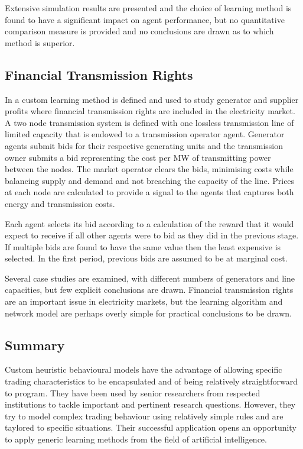 Extensive simulation results are presented and the choice of learning method is
found to have a significant impact on agent performance, but no quantitative
comparison measure is provided and no conclusions are drawn as to which method
is superior.

\subsection{Financial Transmission Rights}
In  a custom learning method is defined and used to study
generator and supplier profits where financial transmission rights are included
in the electricity market.  A two node transmission system is defined with one
lossless transmission line of limited capacity that is endowed to a transmission
operator agent.  Generator agents submit bids for their respective generating
units and the transmission owner submits a bid representing the cost per MW of
transmitting power between the nodes.  The market operator clears the bids,
minimising costs while balancing supply and demand and not breaching the
capacity of the line.  Prices at each node are calculated to provide a signal to
the agents that captures both energy and transmission costs.


Each agent selects its bid according to a calculation of the reward that it
would expect to receive if all other agents were to bid as they did in the
previous stage.  If multiple bids are found to have the same value then the
least expensive is selected.  In the first period, previous bids are assumed to
be at marginal cost.

Several case studies are examined, with different numbers of generators and line
capacities, but few explicit conclusions are drawn.  Financial transmission
rights are an important issue in electricity markets, but the learning algorithm
and network model are perhaps overly simple for practical conclusions to be
drawn.

\subsection{Summary}
Custom heuristic behavioural models have the advantage of allowing specific
trading characteristics to be encapsulated and of being relatively
straightforward to program. They have been used by senior researchers from
respected institutions to tackle important and pertinent research questions.
However, they try to model complex trading behaviour using relatively simple
rules and are taylored to specific situations. Their successful application
opens an opportunity to apply generic learning methods from the field of
artificial intelligence.

